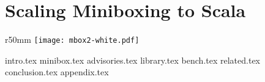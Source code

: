 \chapter{Scaling Miniboxing to Scala}
\label{chapter:mbox2}

\begin{wrapfigure}{r}{50mm}
  \centering
  \vspace{-30em}
  \texttt{[image: mbox2-white.pdf]}
  \vspace{-30em}
\end{wrapfigure}

{intro.tex}
{minibox.tex}
{advisories.tex}
{library.tex}
{bench.tex}
{related.tex}
{conclusion.tex}
{appendix.tex}
